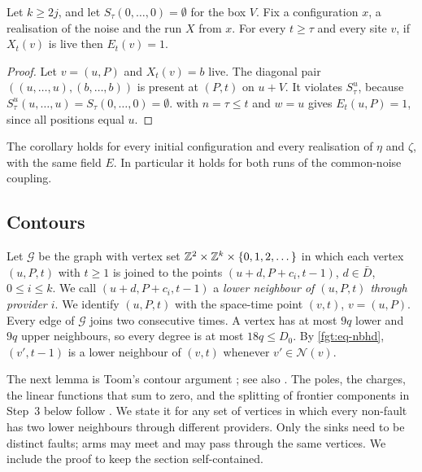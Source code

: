 \begin{corollary}\label{fgt:live}
Let $k\ge2j$, and let $S_\tau(0,\dots,0)=\emptyset$ for the box $V$. Fix a configuration $x$, a realisation of the noise and the run $X$ from $x$. For every $t\ge\tau$ and every site $v$, if $X_t(v)$ is live then $E_t(v)=1$.
\end{corollary}

\begin{proof}
Let $v=(u,P)$ and $X_t(v)=b$ live. The diagonal pair $((u,\dots,u),(b,\dots,b))$ is present at $(P,t)$ on $u+V$. It violates $S^u_\tau$, because $S^u_\tau(u,\dots,u)=S_\tau(0,\dots,0)=\emptyset$.  with $n=\tau\le t$ and $w=u$ gives $E_t(u,P)=1$, since all positions equal $u$.
\end{proof}

The corollary holds for every initial configuration and every realisation of $\eta$ and $\zeta$, with the same field $E$. In particular it holds for both runs of the common-noise coupling.

\subsection{Contours}\label{fgt:sec-contour}

Let $\mathcal G$ be the graph with vertex set $\mathbb{Z}^2\times\mathbb{Z}^k\times\{0,1,2,\dots\}$ in which each vertex $(u,P,t)$ with $t\ge1$ is joined to the points $(u+d,P+c_i,t-1)$, $d\in\bar D$, $0\le i\le k$. We call $(u+d,P+c_i,t-1)$ a \emph{lower neighbour of $(u,P,t)$ through provider $i$}. We identify $(u,P,t)$ with the space-time point $(v,t)$, $v=(u,P)$. Every edge of $\mathcal G$ joins two consecutive times. A vertex has at most $9q$ lower and $9q$ upper neighbours, so every degree is at most $18q\le D_0$. By \eqref{fgt:eq-nbhd}, $(v',t-1)$ is a lower neighbour of $(v,t)$ whenever $v'\in\mathcal N(v)$.

The next lemma is Toom's contour argument \cite{Toom80}; see also \cite{Gacs21}. The poles, the charges, the linear functions that sum to zero, and the splitting of frontier components in Step~3 below follow \cite[Theorem~33, Definitions~35 and~37, Lemma~36]{SST26}. We state it for any set of vertices in which every non-fault has two lower neighbours through different providers. Only the sinks need to be distinct faults; arms may meet and may pass through the same vertices. We include the proof to keep the section self-contained.

